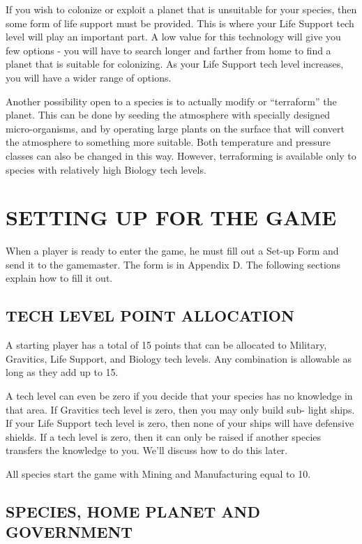 \documentclass[10pt,titlepage]{article}
\begin{document}
If you wish to colonize or exploit a planet that is unsuitable for your
species, then some form of life support must be provided.  This is where your
Life Support tech level will play an important part.  A low value for this
technology will give you few options - you will have to search longer and
farther from home to find a planet that is suitable for colonizing.  As your
Life Support tech level increases, you will have a wider range of options.

Another possibility open to a species is to actually modify or ``terraform'' the
planet.  This can be done by seeding the atmosphere with specially designed
micro-organisms, and by operating large plants on the surface that will convert
the atmosphere to something more suitable.  Both temperature and pressure
classes can also be changed in this way.  However, terraforming is available
only to species with relatively high Biology tech levels.



\section{SETTING UP FOR THE GAME}

When a player is ready to enter the game, he must fill out a Set-up Form and
send it to the gamemaster.  The form is in Appendix D.  The following sections
explain how to fill it out.


\subsection{TECH LEVEL POINT ALLOCATION}

A starting player has a total of 15 points that can be allocated to Military,
Gravitics, Life Support, and Biology tech levels.  Any combination is allowable
as long as they add up to 15.

A tech level can even be zero if you decide that your species has no knowledge
in that area.  If Gravitics tech level is zero, then you may only build sub-
light ships.  If your Life Support tech level is zero, then none of your ships
will have defensive shields.  If a tech level is zero, then it can only be
raised if another species transfers the knowledge to you.  We'll discuss how
to do this later.

All species start the game with Mining and Manufacturing equal to 10.


\subsection{SPECIES, HOME PLANET AND GOVERNMENT}
\end{document}
